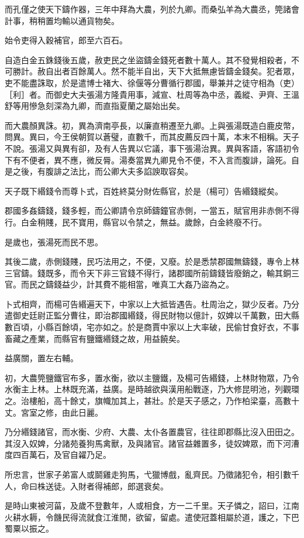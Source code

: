 而孔僅之使天下鑄作器，三年中拜為大農，列於九卿。而桑弘羊為大農丞，筦諸會計事，稍稍置均輸以通貨物矣。

始令吏得入穀補官，郎至六百石。

自造白金五銖錢後五歲，赦吏民之坐盜鑄金錢死者數十萬人。其不發覺相殺者，不可勝計。赦自出者百餘萬人。然不能半自出，天下大抵無慮皆鑄金錢矣。犯者眾，吏不能盡誅取，於是遣博士褚大、徐偃等分曹循行郡國，舉兼并之徒守相為（吏）［利］者。而御史大夫張湯方隆貴用事，減宣、杜周等為中丞，義縱、尹齊、王溫舒等用慘急刻深為九卿，而直指夏蘭之屬始出矣。

而大農顏異誅。初，異為濟南亭長，以廉直稍遷至九卿。上與張湯既造白鹿皮幣，問異。異曰，今王侯朝賀以蒼璧，直數千，而其皮薦反四十萬，本末不相稱。天子不說。張湯又與異有卻，及有人告異以它議，事下張湯治異。異與客語，客語初令下有不便者，異不應，微反脣。湯奏當異九卿見令不便，不入言而腹誹，論死。自是之後，有腹誹之法比，而公卿大夫多諂諛取容矣。

天子既下緡錢令而尊卜式，百姓終莫分財佐縣官，於是（楊可）告緡錢縱矣。

郡國多姦鑄錢，錢多輕，而公卿請令京師鑄鐘官赤側，一當五，賦官用非赤側不得行。白金稍賤，民不寶用，縣官以令禁之，無益。歲餘，白金終廢不行。

是歲也，張湯死而民不思。

其後二歲，赤側錢賤，民巧法用之，不便，又廢。於是悉禁郡國無鑄錢，專令上林三官鑄。錢既多，而令天下非三官錢不得行，諸郡國所前鑄錢皆廢銷之，輸其銅三官。而民之鑄錢益少，計其費不能相當，唯真工大姦乃盜為之。

卜式相齊，而楊可告緡遍天下，中家以上大抵皆遇告。杜周治之，獄少反者。乃分遣御史廷尉正監分曹往，即治郡國緡錢，得民財物以億計，奴婢以千萬數，田大縣數百頃，小縣百餘頃，宅亦如之。於是商賈中家以上大率破，民偷甘食好衣，不事畜藏之產業，而縣官有鹽鐵緡錢之故，用益饒矣。

益廣關，置左右輔。

初，大農筦鹽鐵官布多，置水衡，欲以主鹽鐵，及楊可告緡錢，上林財物眾，乃令水衡主上林。上林既充滿，益廣。是時越欲與漢用船戰逐，乃大修昆明池，列觀環之。治樓船，高十餘丈，旗幟加其上，甚壯。於是天子感之，乃作柏梁臺，高數十丈。宮室之修，由此日麗。

乃分緡錢諸官，而水衡、少府、大農、太仆各置農官，往往即郡縣比沒入田田之。其沒入奴婢，分諸苑養狗馬禽獸，及與諸官。諸官益雜置多，徒奴婢眾，而下河漕度四百萬石，及官自糴乃足。

所忠言，世家子弟富人或鬬雞走狗馬，弋獵博戲，亂齊民。乃徵諸犯令，相引數千人，命曰株送徒。入財者得補郎，郎選衰矣。

是時山東被河菑，及歲不登數年，人或相食，方一二千里。天子憐之，詔曰，江南火耕水耨，令饑民得流就食江淮閒，欲留，留處。遣使冠蓋相屬於道，護之，下巴蜀粟以振之。

